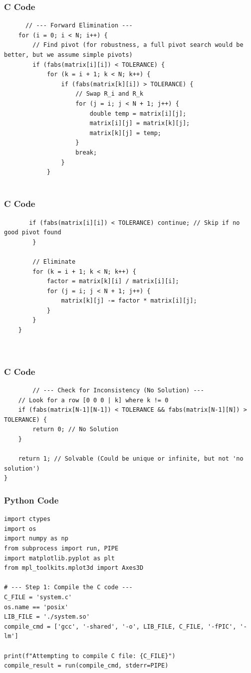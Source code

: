 \documentclass{beamer}
\begin{document}
    \begin{frame}[fragile]
        \frametitle{C Code}
        \begin{lstlisting}
      // --- Forward Elimination ---
    for (i = 0; i < N; i++) {
        // Find pivot (for robustness, a full pivot search would be better, but we assume simple pivots)
        if (fabs(matrix[i][i]) < TOLERANCE) {
            for (k = i + 1; k < N; k++) {
                if (fabs(matrix[k][i]) > TOLERANCE) {
                    // Swap R_i and R_k
                    for (j = i; j < N + 1; j++) {
                        double temp = matrix[i][j];
                        matrix[i][j] = matrix[k][j];
                        matrix[k][j] = temp;
                    }
                    break;
                }
            }
           
        \end{lstlisting}
    \end{frame}
    
    \begin{frame}[fragile]
        \frametitle{C Code}
        \begin{lstlisting}
       if (fabs(matrix[i][i]) < TOLERANCE) continue; // Skip if no good pivot found
        }

        // Eliminate
        for (k = i + 1; k < N; k++) {
            factor = matrix[k][i] / matrix[i][i];
            for (j = i; j < N + 1; j++) {
                matrix[k][j] -= factor * matrix[i][j];
            }
        }
    }

   
        \end{lstlisting}
    \end{frame}

     \begin{frame}[fragile]
        \frametitle{C Code}
        \begin{lstlisting}
        // --- Check for Inconsistency (No Solution) ---
    // Look for a row [0 0 0 | k] where k != 0
    if (fabs(matrix[N-1][N-1]) < TOLERANCE && fabs(matrix[N-1][N]) > TOLERANCE) {
        return 0; // No Solution
    }
    
    return 1; // Solvable (Could be unique or infinite, but not 'no solution')
}
        \end{lstlisting}
    \end{frame}
    
    \begin{frame}[fragile]
        \frametitle{Python Code}
        \begin{lstlisting}
import ctypes
import os
import numpy as np
from subprocess import run, PIPE
import matplotlib.pyplot as plt
from mpl_toolkits.mplot3d import Axes3D

# --- Step 1: Compile the C code ---
C_FILE = 'system.c'
os.name == 'posix'
LIB_FILE = './system.so'
compile_cmd = ['gcc', '-shared', '-o', LIB_FILE, C_FILE, '-fPIC', '-lm']

print(f"Attempting to compile C file: {C_FILE}")
compile_result = run(compile_cmd, stderr=PIPE)




        \end{lstlisting}
    \end{frame}
    
\end{document}

